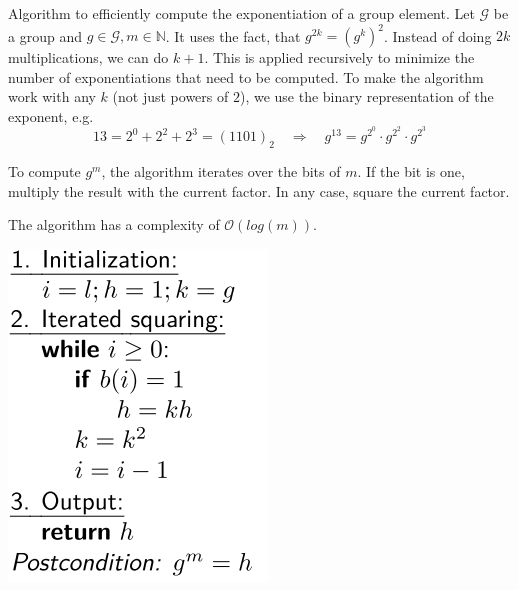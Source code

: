 \begin{minipage}{.7\linewidth}

Algorithm to efficiently compute the exponentiation of a group element.
Let \(\mathcal{G}\) be a group and
\(g \in \mathcal{G}, m \in \mathbb{N}\). It uses the fact, that
\(g^{2k} = (g^k)^2\). Instead of doing \(2k\) multiplications, we can do
\(k + 1\). This is applied recursively to minimize the number of
exponentiations that need to be computed. To make the algorithm work
with any \(k\) (not just powers of \(2\)), we use the binary
representation of the exponent, e.g.
\[13 = 2^0 + 2^2 + 2^3 = (1101)_2 \quad \Rightarrow \quad g^{13} = g^{2^0} \cdot g^{2^2} \cdot g^{2^3}\]

To compute \(g^m\), the algorithm iterates over the bits of \(m\). If
the bit is one, multiply the result with the current factor. In any
case, square the current factor.

The algorithm has a complexity of \(\mathcal{O}(log(m))\).

\end{minipage}\hfill
\begin{minipage}{.25\linewidth}
\includegraphics[width=\linewidth]{img/fast_exp}
\end{minipage}

